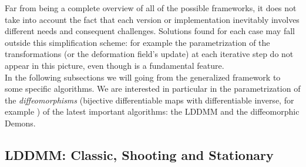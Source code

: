 \noindent
Far from being a complete overview of all of the possible frameworks, it does not take into account the fact that each version or implementation inevitably involves different needs and consequent challenges. Solutions found for each case may fall outside this simplification scheme: for example the parametrization of the transformations (or the deformation field's update) at each iterative step do not appear in this picture, even though is a fundamental feature. \\
In the following subsections we will going from the generalized framework to some specific algorithms. We are interested in particular in the parametrization of the \emph{diffeomorphisms} (bijective differentiable maps with differentiable inverse, for example \cite{lee2012introduction}) of the latest important algorithms: the LDDMM and the diffeomorphic Demons.

\subsection{LDDMM: Classic, Shooting and Stationary}

